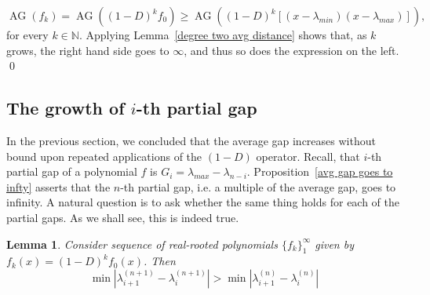 \documentclass[11pt]{article}
\DeclareMathOperator{\AG}{AG}
\newtheorem{lemma}[theorem]{Lemma}
\begin{document}
\[\AG(f_k)= \AG((1-D)^kf_0)\geq\AG((1-D)^k [(x-\lambda_{min})(x-\lambda_{max})]),\]
for every $k\in\mathbb{N}$. Applying Lemma~\ref{degree two avg distance} shows that, as $k$ grows, the right hand side goes to $\infty$, and thus so does the expression on the left. \qed

\subsection{The growth of $i$-th partial gap}
In the previous section, we concluded that the average gap increases without bound upon repeated applications of the $(1-D)$ operator. Recall, that $i$-th partial gap of a polynomial $f$ is $G_i = \lambda_{max} - \lambda_{n-i}$. Proposition~\ref{avg gap goes to infty} asserts that the $n$-th partial gap, i.e. a multiple of the average gap, goes to infinity. A natural question is to ask whether the same thing holds for each of the partial gaps. As we shall see, this is indeed true.

\begin{lemma}
\label{minimal gap increases}
 Consider sequence of real-rooted polynomials $\{f_k\}_1^\infty$ given by $f_k(x) = (1-D)^k f_0(x)$. Then
 \[\min |\lambda^{(n+1)}_{i+1} - \lambda^{(n+1)}_i | > \min |\lambda^{(n)}_{i+1} - \lambda^{(n)}_i |\]
\end{lemma}
\end{document}
